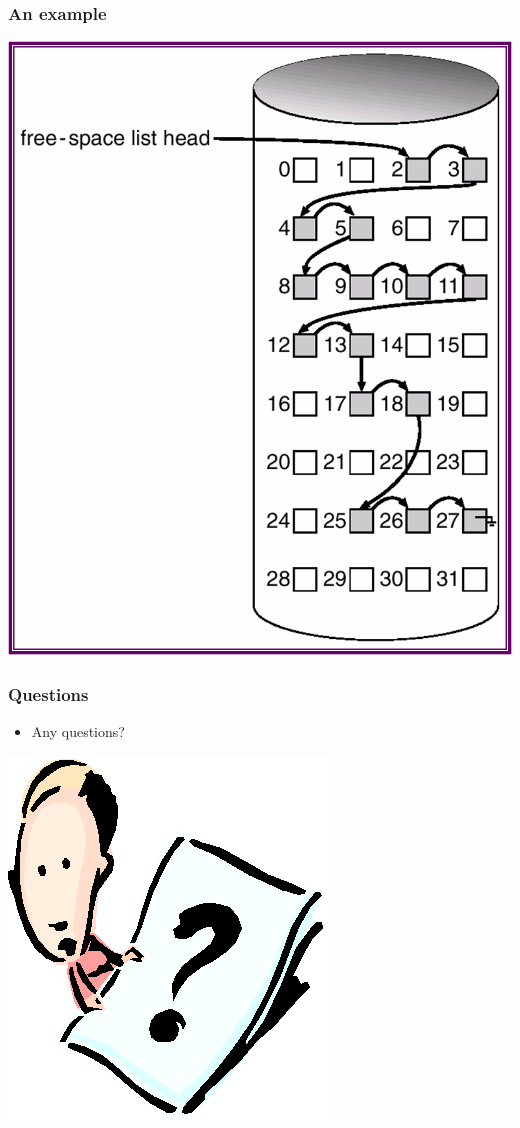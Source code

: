 \documentclass[CJKutf8,xcolor=pdftex,dvipsnames,table]{beamer}
\begin{document}
\begin{CJK*}{UTF8}{song}
  \begin{frame}
    \frametitle{An example} \pause
    \begin{center}\parskip=0pt
      \includegraphics[scale=.4]{v6f12-10}
    \end{center}
  \end{frame}
  
  \begin{frame}
    \frametitle{Questions}
    \begin{itemize}
    \item Any questions?
    \end{itemize}
    \begin{center}
      \includegraphics[scale=.5]{question}
    \end{center}
  \end{frame}


\end{CJK*}
\end{document}
